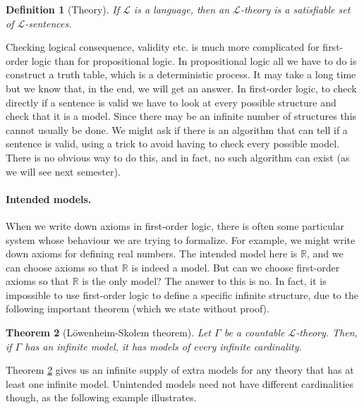 \documentclass{article}
\theoremstyle{plain}
\newtheorem{theorem}{Theorem}[section]{\bfseries}{\itshape}
\newtheorem{definition}[theorem]{Definition}{\bfseries}{\upshape}
\newcommand{\bR}{\mathbb{R}}
\newcommand{\sL}{\mathscr{L}}
\begin{document}
\begin{definition}[Theory]\label{D:theory}
If $\sL$ is a language, then an $\sL$-\emph{theory} is a satisfiable set of $\sL$-sentences. 
\end{definition}

Checking logical consequence, validity etc. is much more complicated for first-order logic than for propositional logic. In propositional logic all we have to do is construct a truth table, which is a deterministic process. It may take a long time but we know that, in the end, we will get an answer. In first-order logic, to check directly if a sentence is valid we have to look at every possible structure and check that it is a model. Since there may be an infinite number of structures this cannot usually be done. We might ask if there is an algorithm that can tell if a sentence is valid, using a trick to avoid having to check every possible model. There is no obvious way to do this, and in fact, no such algorithm can exist (as we will see next semester).

\paragraph{Intended models.} When we write down axioms in first-order logic, there is often some particular system whose behaviour we are trying to formalize. For example, we might write down axioms for defining real numbers. The intended model here is $\bR$, and we can choose axioms so that $\bR$ is indeed a model. But can we choose first-order axioms so that $\bR$ is the only model? The answer to this is no. In fact, it is impossible to use first-order logic to define a specific infinite structure, due to the following important theorem (which we state without proof). 

\begin{theorem}[L\"owenheim-Skolem theorem]\label{T:LS}
Let $\Gamma$ be a countable $\sL$-theory. Then, if $\Gamma$ has an infinite model, it has models of every infinite cardinality.
\end{theorem}

Theorem \ref{T:LS} gives us an infinite supply of extra models for any theory that has at least one infinite model. Unintended models need not have different cardinalities though, as the following example illustrates.
\end{document}
